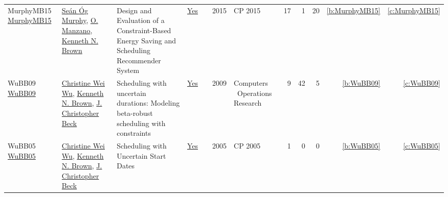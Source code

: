 {\begin{longtable}{>{\raggedright\arraybackslash}p{3cm}>{\raggedright\arraybackslash}p{6cm}>{\raggedright\arraybackslash}p{6.5cm}rrrp{2.5cm}rrrrr}
MurphyMB15 \href{https://doi.org/10.1007/978-3-319-23219-5\_47}{MurphyMB15} & \hyperref[auth:a221]{Se{\'{a}}n {\'{O}}g Murphy}, \hyperref[auth:a222]{O. Manzano}, \hyperref[auth:a223]{Kenneth N. Brown} & Design and Evaluation of a Constraint-Based Energy Saving and Scheduling Recommender System & \href{../works/MurphyMB15.pdf}{Yes} & \cite{MurphyMB15} & 2015 & CP 2015 & 17 & 1 & 20 & \ref{b:MurphyMB15} & \ref{c:MurphyMB15}\\
WuBB09 \href{https://doi.org/10.1016/j.cor.2008.08.008}{WuBB09} & \hyperref[auth:a277]{Christine Wei Wu}, \hyperref[auth:a223]{Kenneth N. Brown}, \hyperref[auth:a89]{J. Christopher Beck} & Scheduling with uncertain durations: Modeling beta-robust scheduling with constraints & \href{../works/WuBB09.pdf}{Yes} & \cite{WuBB09} & 2009 & Computers \  Operations Research & 9 & 42 & 5 & \ref{b:WuBB09} & \ref{c:WuBB09}\\
WuBB05 \href{https://doi.org/10.1007/11564751\_110}{WuBB05} & \hyperref[auth:a277]{Christine Wei Wu}, \hyperref[auth:a223]{Kenneth N. Brown}, \hyperref[auth:a89]{J. Christopher Beck} & Scheduling with Uncertain Start Dates & \href{../works/WuBB05.pdf}{Yes} & \cite{WuBB05} & 2005 & CP 2005 & 1 & 0 & 0 & \ref{b:WuBB05} & \ref{c:WuBB05}\\
\end{longtable}
}

\clearpage
